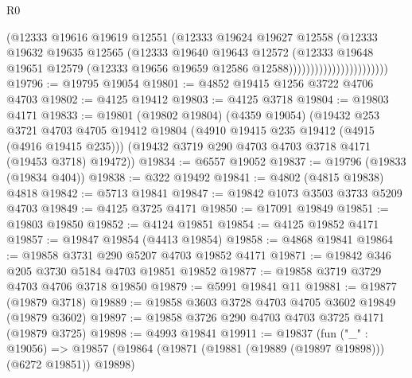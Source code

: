 \begin{lexlean}{R0}
\begin{coremodule}
                                      (@12333
                                        @19616
                                        @19619
                                        @12551
                                        (@12333
                                          @19624
                                          @19627
                                          @12558
                                          (@12333
                                            @19632
                                            @19635
                                            @12565
                                            (@12333
                                              @19640
                                              @19643
                                              @12572
                                              (@12333
                                                @19648
                                                @19651
                                                @12579
                                                (@12333
                                                  @19656
                                                  @19659
                                                  @12586
                                                  @12588)))))))))))))))))))))))
@19796 := @19795 @19054
@19801 := @4852 @19415 @1256 @3722 @4706 @4703
@19802 := @4125 @19412
@19803 := @4125 @3718
@19804 := @19803 @4171
@19833 := @19801
    (@19802 @19804)
    (@4359 @19054)
    (@19432
      @253
      @3721
      @4703
      @4705
      @19412
      @19804
      (@4910 @19415 @235 @19412 (@4915 (@4916 @19415 @235)))
      (@19432 @3719 @290 @4703 @4703 @3718 @4171 (@19453 @3718) @19472))
@19834 := @6557 @19052
@19837 := @19796 (@19833 (@19834 @404))
@19838 := @322 @19492
@19841 := @4802 (@4815 @19838) @4818
@19842 := @5713 @19841
@19847 := @19842 @1073 @3503 @3733 @5209 @4703
@19849 := @4125 @3725 @4171
@19850 := @17091 @19849
@19851 := @19803 @19850
@19852 := @4124 @19851
@19854 := @4125 @19852 @4171
@19857 := @19847 @19854 (@4413 @19854)
@19858 := @4868 @19841
@19864 := @19858 @3731 @290 @5207 @4703 @19852 @4171
@19871 := @19842 @346 @205 @3730 @5184 @4703 @19851 @19852
@19877 := @19858 @3719 @3729 @4703 @4706 @3718 @19850
@19879 := @5991 @19841 @11
@19881 := @19877 (@19879 @3718)
@19889 := @19858 @3603 @3728 @4703 @4705 @3602 @19849 (@19879 @3602)
@19897 := @19858 @3726 @290 @4703 @4703 @3725 @4171 (@19879 @3725)
@19898 := @4993 @19841
@19911 := @19837
    (fun ("_" : @19056) =>
    @19857
      (@19864 (@19871 (@19881 (@19889 (@19897 @19898))) (@6272 @19851)) @19898)

\end{coremodule}
\end{lexlean}
